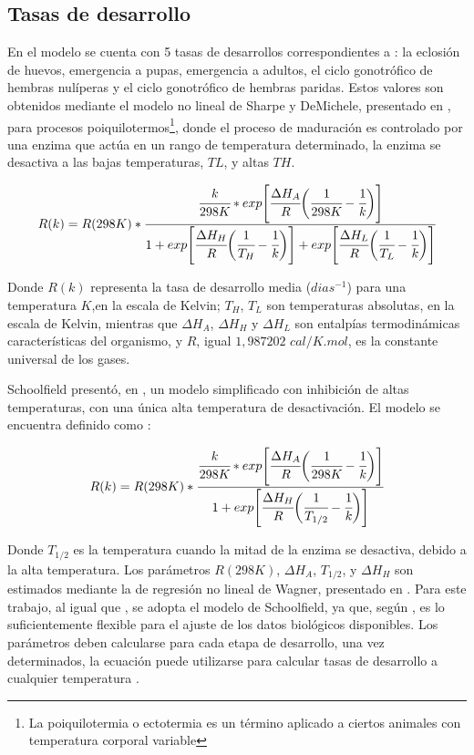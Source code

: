 \subsection{Tasas de desarrollo}
\label{subsec:cap4-tasas de desarrollo}
En el modelo se cuenta con 5 tasas de desarrollos correspondientes a : la eclosión de huevos,
emergencia a pupas, emergencia a adultos, el ciclo gonotrófico de hembras nulíperas y el ciclo gonotrófico de hembras paridas. Estos valores son obtenidos mediante el modelo no lineal de
Sharpe y DeMichele, presentado en \cite{sharpe1977reaction}, para procesos poiquilotermos\footnote{ La poiquilotermia o ectotermia es un término aplicado a ciertos animales con temperatura corporal
variable}, donde el proceso de maduración es controlado por una enzima que actúa en un rango de temperatura determinado, la enzima se desactiva a las bajas temperaturas, $TL$, y altas $TH$.

\begin{equation} \label{eq:sharpe-demichele}
   R(k)  = R(298K) *\cfrac{ \cfrac{k}{298K} *
    exp \Bigg[
            \cfrac{\Delta H_{A}}{R} \bigg(\cfrac{1}{298K} - \cfrac{1}{k}\bigg)
        \Bigg]}
    {1 + exp\Bigg[\cfrac{\Delta H_{H}}{R} \bigg(\cfrac{1}{T_{H}}- \cfrac{1}{k}\bigg)\Bigg] +  exp\Bigg[\cfrac{\Delta H_{L}}{R} \bigg(\cfrac{1}{T_{L}}- \cfrac{1}{k}\bigg)\Bigg]}
\end{equation}

Donde $R(k)$ representa la tasa de desarrollo media ($dias^{-1}$) para una temperatura $K$,en la
escala de Kelvin; $T_{H}$, $T_{L}$ son temperaturas absolutas, en la escala de Kelvin, mientras
que $\Delta H_{A}$, $\Delta H_{H}$ y $\Delta H_{L}$ son entalpías termodinámicas características
del organismo, y $R$, igual $1,987202$ $cal/K.mol$, es la constante universal de los gases.

Schoolfield presentó, en \cite{schoolfield1981non}, un modelo simplificado con inhibición de altas
temperaturas, con una única alta temperatura de desactivación. El modelo se encuentra definido
como :

\begin{equation} \label{eq:schoolfield}
   R(k)  = R(298K) *\cfrac{ \cfrac{k}{298K} *
    exp \Bigg[
            \cfrac{\Delta H_{A}}{R} \bigg(\cfrac{1}{298K} - \cfrac{1}{k}\bigg)
        \Bigg]}
    {1 + exp\Bigg[\cfrac{\Delta H_{H}}{R} \bigg(\cfrac{1}{T_{1/2}}- \cfrac{1}{k}\bigg)\Bigg] }
\end{equation}

Donde $T_{1/2}$ es la temperatura cuando la mitad de la enzima se desactiva, debido a la alta
temperatura. Los parámetros $R(298K)$, $\Delta H_{A}$, $T_{1/2}$, y $\Delta H_{H}$ son estimados
mediante la de regresión no lineal de Wagner, presentado en \cite{wagner1984modeling}. Para este
trabajo, al igual que \cite{rueda1990temperature, otero2006stochastic}, se adopta el modelo de
Schoolfield, ya que, según \cite{otero2006stochastic}, es lo suficientemente flexible para el
ajuste de los datos biológicos disponibles. Los parámetros deben calcularse para cada etapa de
desarrollo, una vez determinados, la ecuación puede utilizarse para calcular tasas de desarrollo a
cualquier temperatura \cite{rueda1990temperature}.
